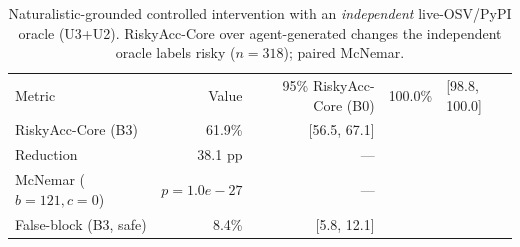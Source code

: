 \begin{table}[t]\centering
\caption{Naturalistic-grounded controlled intervention with an \emph{independent} live-OSV/PyPI oracle (U3+U2). RiskyAcc-Core over agent-generated changes the independent oracle labels risky ($n=318$); paired McNemar.}
\label{tab:e1a-indep}
\begin{tabular}{lrr}
\toprule
Metric & Value & 95\%%
\midrule
RiskyAcc-Core (B0) & 100.0\% & [98.8, 100.0] \\
RiskyAcc-Core (B3) & 61.9\% & [56.5, 67.1] \\
Reduction & 38.1 pp & --- \\
McNemar ($b{=}121,c{=}0$) & $p{=}1.0e-27$ & --- \\
False-block (B3, safe) & 8.4\% & [5.8, 12.1] \\
\bottomrule
\end{tabular}
\end{table}
